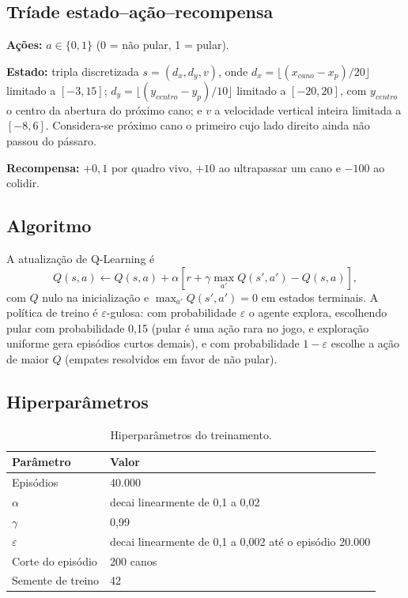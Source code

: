 \documentclass[conference]{IEEEtran}
\begin{document}
\subsection{Tríade estado--ação--recompensa}
\textbf{Ações:} $a\in\{0,1\}$ (0 = não pular, 1 = pular).

\textbf{Estado:} tripla discretizada $s=(d_x, d_y, v)$, onde $d_x=\lfloor (x_{cano}-x_{p})/20\rfloor$ limitado a $[-3,15]$; $d_y=\lfloor (y_{centro}-y_p)/10\rfloor$ limitado a $[-20,20]$, com $y_{centro}$ o centro da abertura do próximo cano; e $v$ a velocidade vertical inteira limitada a $[-8,6]$. Considera-se próximo cano o primeiro cujo lado direito ainda não passou do pássaro.

\textbf{Recompensa:} $+0{,}1$ por quadro vivo, $+10$ ao ultrapassar um cano e $-100$ ao colidir.

\subsection{Algoritmo}
A atualização de Q-Learning é
\begin{equation}
Q(s,a)\leftarrow Q(s,a)+\alpha\left[r+\gamma\max_{a'}Q(s',a')-Q(s,a)\right],
\end{equation}
com $Q$ nulo na inicialização e $\max_{a'}Q(s',a')=0$ em estados terminais. A política de treino é $\varepsilon$-gulosa: com probabilidade $\varepsilon$ o agente explora, escolhendo pular com probabilidade 0,15 (pular é uma ação rara no jogo, e exploração uniforme gera episódios curtos demais), e com probabilidade $1-\varepsilon$ escolhe a ação de maior $Q$ (empates resolvidos em favor de não pular).

\subsection{Hiperparâmetros}
\begin{table}[h]
\centering
\caption{Hiperparâmetros do treinamento.}
\begin{tabular}{ll}
\toprule
Parâmetro & Valor \\
\midrule
Episódios & 40.000 \\
$\alpha$ & decai linearmente de 0,1 a 0,02 \\
$\gamma$ & 0,99 \\
$\varepsilon$ & decai linearmente de 0,1 a 0,002 até o episódio 20.000 \\
Corte do episódio & 200 canos \\
Semente de treino & 42 \\
\bottomrule
\end{tabular}
\end{table}
\end{document}
